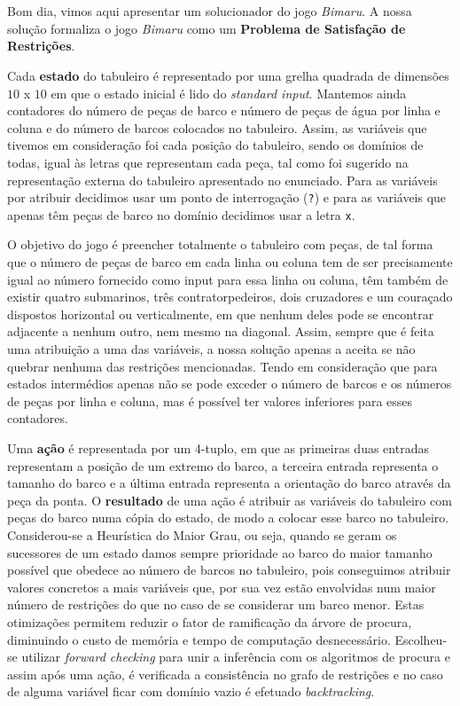 \documentclass[12pt,a4paper]{article}
\begin{document}
\section*{}
\vspace*{10pt}

Bom dia, vimos aqui apresentar um solucionador do jogo \textit{Bimaru}.
A nossa solução formaliza o jogo \textit{Bimaru} como um \textbf{Problema de Satisfação de Restrições}.

Cada \textbf{estado} do tabuleiro é representado por uma grelha quadrada de dimensões $10$ x $10$ em que
o estado inicial é lido do \textit{standard input}. Mantemos ainda contadores do número de peças de barco e
número de peças de água por linha e coluna e do número de barcos colocados no tabuleiro.
Assim, as variáveis que tivemos em consideração foi cada posição do tabuleiro, sendo os domínios de todas, igual
às letras que representam cada peça, tal como foi sugerido na representação externa do tabuleiro
apresentado no enunciado. Para as variáveis por atribuir decidimos usar um ponto de interrogação (\texttt{?}) e para
as variáveis que apenas têm peças de barco no domínio decidimos usar a letra \texttt{x}.

O objetivo do jogo é preencher totalmente o tabuleiro com peças, de tal forma que o número de peças de barco em cada linha ou coluna tem de ser
precisamente igual ao número fornecido como input para essa linha ou coluna, têm também de existir quatro submarinos, três contratorpedeiros,
dois cruzadores e um couraçado dispostos horizontal ou verticalmente, em que nenhum deles pode se encontrar adjacente a nenhum outro, nem
mesmo na diagonal.
Assim, sempre que é feita uma atribuição a uma das variáveis, a nossa solução apenas a aceita se não quebrar nenhuma das restrições
mencionadas. Tendo em consideração que para estados intermédios apenas não se pode exceder o número de barcos e os números de peças
por linha e coluna, mas é possível ter valores inferiores para esses contadores.

Uma \textbf{ação} é representada por um 4-tuplo, em que as primeiras duas entradas representam a posição de um extremo do barco, a terceira entrada representa o
tamanho do barco e a última entrada representa a orientação do barco através da peça da ponta. O \textbf{resultado} de uma ação é atribuir as variáveis
do tabuleiro com peças do barco numa cópia do estado, de modo a colocar esse barco no tabuleiro.
Considerou-se a Heurística do Maior Grau, ou seja, quando se geram os sucessores de um estado damos sempre prioridade ao barco do maior tamanho possível
que obedece ao número de barcos no tabuleiro, pois conseguimos atribuir valores concretos a mais variáveis que, por sua vez estão envolvidas
num maior número de restrições do que no caso de se considerar um barco menor.
Estas otimizações permitem reduzir o fator de ramificação da árvore de procura, diminuindo o custo de memória e tempo de computação desnecessário.
Escolheu-se utilizar \textit{forward checking} para unir a inferência com os algoritmos de procura e assim após uma ação, é verificada a consistência
no grafo de restrições e no caso de alguma variável ficar com domínio vazio é efetuado \textit{backtracking}.
\end{document}
